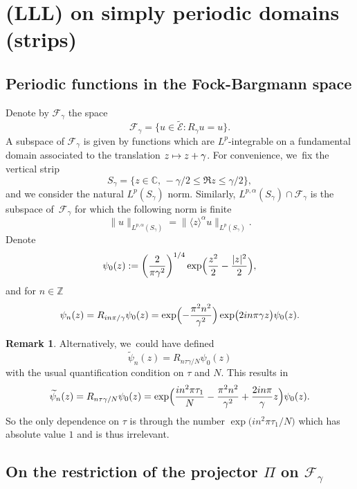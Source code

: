 \documentclass[10pt]{amsart}
\let\Subsection\subsection
\newcommand\mto{\mathchoice{\longmapsto}{\mapsto}{\mapsto}{\mapsto}}
\let\sep:
\theoremstyle{definition}
\newtheorem{remark}[theorem]{Remark}
\let\EE\exp
\let\wt\widetilde
\newcommand\Z{\mathbb Z}
\begin{document}
\section{(LLL) on simply periodic domains (strips)}
\label{section3}

\subsection{Periodic functions in the Fock-Bargmann space}
Denote by $\mathcal{F}_{\gamma}$ the space
\begin{equation*}
\mathcal{F}_{\gamma}=\bigl\{u\in \widetilde{{\mathcal{E}}}\sep R_{\gamma}u=u\bigr\}.
\end{equation*}
A subspace of $\mathcal{F}_\gamma$ is given by functions which are $L^p$-integrable on a fundamental domain associated to the translation $z \mto z+\gamma$. For convenience, we~fix the vertical strip
\[
S_\gamma = \bigl\{ z \in \mathbb{C}, \, -{\gamma}/{2} \leq \Re z \leq {\gamma}/{2} \bigr\},
\]
and we consider the natural $L^p(S_\gamma)$ norm. Similarly, $L^{p,\alpha}(S_\gamma) \cap \mathcal{F}_{\gamma} $ is the subspace of~$\mathcal{F}_\gamma$ for which the following norm is finite
\[
\| u \|_{L^{p,\alpha}(S_\gamma)} = \| \langle z \rangle^\alpha u \|_{L^p(S_\gamma)}.
\]
Denote
\[
\psi_0(z):=\left(\frac{2}{\pi \gamma^2}\right)^{1/4}\EE\Bigl({\frac{z^2}2-\frac{|z|^2}2}\Bigr),
\]
and for $n\in \Z$
\begin{equation*}
\psi_n(z) = R_{{i n \pi}/ \gamma}\psi_0(z) = \EE\Bigl({-\frac{\pi^2 n^2}{\gamma^2}}\Bigr) \EE\bigl({{2in\pi}{\gamma} z}\bigr)\psi_0(z).
\end{equation*}

\begin{remark}
Alternatively, we~could have defined
\[
\wt{\psi}_n(z) =R_{{n\tau \gamma}/ N}\psi_0(z)
\]
with the usual quantification condition on $\tau$ and $N$. This results in
\[
\wt{\psi}_n(z) =R_{{n\tau \gamma}/ N}\psi_0(z)= \EE\Bigl(\frac{i n^2 \pi \tau_1}{N} -\frac{\pi^2 n^2}{\gamma^2}+ \frac{2in\pi}{\gamma} z\Bigr) \psi_0(z).
\]
So the only dependence on $\tau$ is through the number $\EE\bigl({i {n^2 \pi \tau_1}/ {N}}\bigr)$ which has absolute value $1$ and is thus irrelevant.
\end{remark}

\Subsection{On the restriction of the projector $\Pi$ on $\mathcal{F}_\gamma$}
\end{document}
